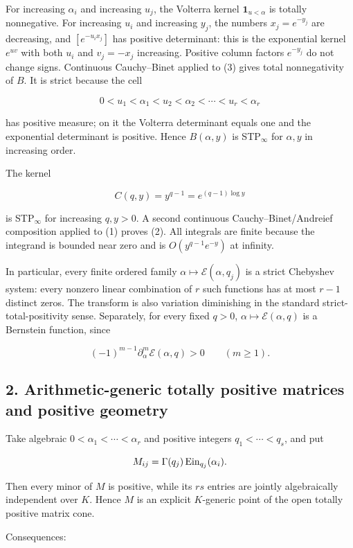 For increasing \(\alpha_i\) and increasing \(u_j\), the Volterra kernel
\(\mathbf1_{u<\alpha}\) is totally nonnegative. For increasing \(u_i\) and
increasing \(y_j\), the numbers \(x_j=e^{-y_j}\) are decreasing, and
\([e^{-u_i x_j}]\) has positive determinant: this is the exponential kernel
\(e^{uv}\) with both \(u_i\) and \(v_j=-x_j\) increasing. Positive column
factors \(e^{-y_j}\) do not change signs. Continuous Cauchy--Binet applied
to (3) gives total nonnegativity of \(B\). It is strict because the cell

\[
0<u_1<\alpha_1<u_2<\alpha_2<\cdots<u_r<\alpha_r
\]

has positive measure; on it the Volterra determinant equals one and the
exponential determinant is positive. Hence \(B(\alpha,y)\) is STP\(_\infty\)
for \(\alpha,y\) in increasing order.

The kernel

\[
C(q,y)=y^{q-1}=e^{(q-1)\log y}
\]

is STP\(_\infty\) for increasing \(q,y>0\). A second continuous
Cauchy--Binet/Andreief composition applied to (1) proves (2). All integrals
are finite because the integrand is bounded near zero and is
\(O(y^{q-1}e^{-y})\) at infinity.

In particular, every finite ordered family
\(\alpha\mapsto\mathcal E(\alpha,q_j)\) is a strict Chebyshev system:
every nonzero linear combination of \(r\) such functions has at most
\(r-1\) distinct zeros. The transform is also variation diminishing in the
standard strict-total-positivity sense. Separately,
for every fixed \(q>0\), \(\alpha\mapsto\mathcal E(\alpha,q)\) is a
Bernstein function, since

\[
(-1)^{m-1}\partial_\alpha^m\mathcal E(\alpha,q)>0\qquad(m\ge1).
\]

\subsection{2. Arithmetic-generic totally positive matrices and positive geometry}

Take algebraic \(0<\alpha_1<\cdots<\alpha_r\) and positive integers
\(q_1<\cdots<q_s\), and put

\[
M_{ij}=\Gamma(q_j)\operatorname{Ein}_{q_j}(\alpha_i).
\]

Then every minor of \(M\) is positive, while its \(rs\) entries are jointly
algebraically independent over \(K\). Hence \(M\) is an explicit
\(K\)-generic point of the open totally positive matrix cone.

Consequences:


